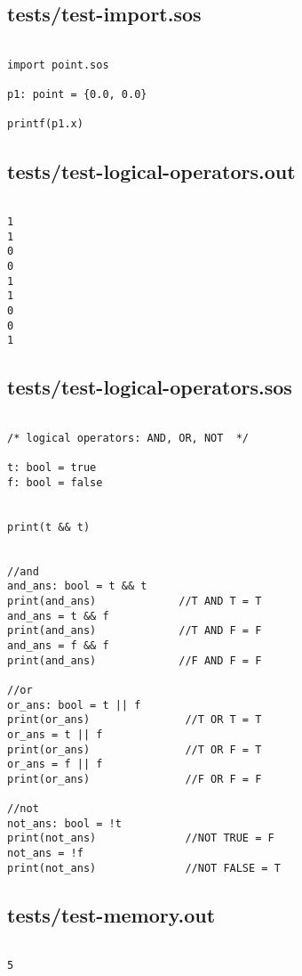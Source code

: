 \documentclass[main.tex]{subfiles}
\begin{document}
\subsection{tests/test-import.sos}

\begin{lstlisting}

import point.sos

p1: point = {0.0, 0.0}

printf(p1.x)
\end{lstlisting}

\subsection{tests/test-logical-operators.out}

\begin{lstlisting}

1
1
0
0
1
1
0
0
1
\end{lstlisting}

\subsection{tests/test-logical-operators.sos}

\begin{lstlisting}

/* logical operators: AND, OR, NOT  */

t: bool = true
f: bool = false


print(t && t)


//and
and_ans: bool = t && t
print(and_ans)             //T AND T = T
and_ans = t && f
print(and_ans)             //T AND F = F
and_ans = f && f
print(and_ans)             //F AND F = F

//or
or_ans: bool = t || f
print(or_ans)               //T OR T = T
or_ans = t || f
print(or_ans)               //T OR F = T
or_ans = f || f
print(or_ans)               //F OR F = F

//not
not_ans: bool = !t
print(not_ans)              //NOT TRUE = F
not_ans = !f
print(not_ans)              //NOT FALSE = T
\end{lstlisting}

\subsection{tests/test-memory.out}

\begin{lstlisting}

5
\end{lstlisting}
\end{document}
